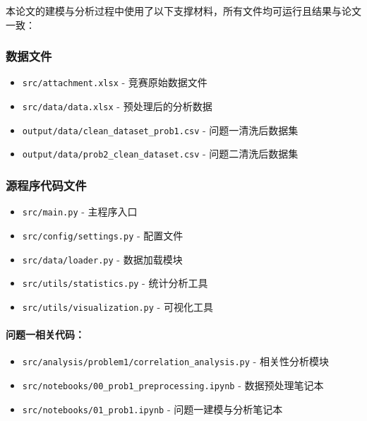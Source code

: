 \documentclass[withoutpreface]{cumcmthesis}
\begin{document}
本论文的建模与分析过程中使用了以下支撑材料，所有文件均可运行且结果与论文一致：

\subsubsection{数据文件}
\begin{itemize}
    \item \texttt{src/attachment.xlsx} - 竞赛原始数据文件
    \item \texttt{src/data/data.xlsx} - 预处理后的分析数据
    \item \texttt{output/data/clean\_dataset\_prob1.csv} - 问题一清洗后数据集
    \item \texttt{output/data/prob2\_clean\_dataset.csv} - 问题二清洗后数据集
\end{itemize}

\subsubsection{源程序代码文件}
\begin{itemize}
    \item \texttt{src/main.py} - 主程序入口
    \item \texttt{src/config/settings.py} - 配置文件
    \item \texttt{src/data/loader.py} - 数据加载模块
    \item \texttt{src/utils/statistics.py} - 统计分析工具
    \item \texttt{src/utils/visualization.py} - 可视化工具
\end{itemize}

\paragraph{问题一相关代码：}
\begin{itemize}
    \item \texttt{src/analysis/problem1/correlation\_analysis.py} - 相关性分析模块
    \item \texttt{src/notebooks/00\_prob1\_preprocessing.ipynb} - 数据预处理笔记本
    \item \texttt{src/notebooks/01\_prob1.ipynb} - 问题一建模与分析笔记本
\end{itemize}
\end{document}
